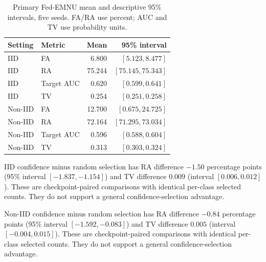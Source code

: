 \begin{table}[H]\centering\small

\caption{Primary Fed-EMNU mean and descriptive 95\% intervals, five seeds. FA/RA use percent; AUC and TV use probability units.}

\label{tab:five-ci}

\begin{tabular}{llrr}\toprule Setting & Metric & Mean & 95\% interval\\\midrule

IID & FA & 6.800 & $[5.123, 8.477]$\\

IID & RA & 75.244 & $[75.145, 75.343]$\\

IID & Target AUC & 0.620 & $[0.599, 0.641]$\\

IID & TV & 0.254 & $[0.251, 0.258]$\\

Non-IID & FA & 12.700 & $[0.675, 24.725]$\\

Non-IID & RA & 72.164 & $[71.295, 73.034]$\\

Non-IID & Target AUC & 0.596 & $[0.588, 0.604]$\\

Non-IID & TV & 0.313 & $[0.303, 0.324]$\\

\bottomrule\end{tabular}\end{table}

IID confidence minus random selection has RA difference $-1.50$ percentage points (95\% interval $[-1.837, -1.154]$) and TV difference $0.009$ (interval $[0.006, 0.012]$). These are checkpoint-paired comparisons with identical per-class selected counts. They do not support a general confidence-selection advantage.

Non-IID confidence minus random selection has RA difference $-0.84$ percentage points (95\% interval $[-1.592, -0.083]$) and TV difference $0.005$ (interval $[-0.004, 0.015]$). These are checkpoint-paired comparisons with identical per-class selected counts. They do not support a general confidence-selection advantage.
